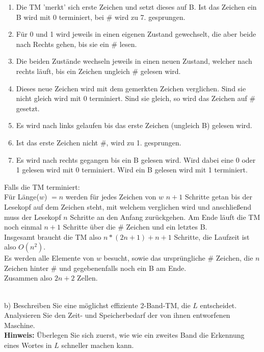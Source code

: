 \begin{enumerate}
\item Die TM 'merkt' sich erste Zeichen und setzt dieses auf B. Ist das Zeichen ein B wird mit 0 terminiert, bei $\#$ wird zu 7. gesprungen.
\item Für 0 und 1 wird jeweils in einen eigenen Zustand gewechselt, die aber beide nach Rechts gehen, bis sie ein $\#$ lesen.
\item Die beiden Zustände wechseln jeweils in einen neuen Zustand, welcher nach rechts läuft, bis ein Zeichen ungleich $\#$ gelesen wird.
\item Dieses neue Zeichen wird mit dem gemerkten Zeichen verglichen. Sind sie nicht gleich wird mit 0 terminiert. Sind sie gleich, so wird das Zeichen auf $\#$ gesetzt.
\item Es wird nach links gelaufen bis das erste Zeichen (ungleich B) gelesen wird.
\item Ist das erste Zeichen nicht $\#$, wird zu 1. gesprungen.
\item Es wird nach rechts gegangen bis ein B gelesen wird. Wird dabei eine 0 oder 1 gelesen wird mit 0 terminiert. Wird ein B gelesen wird mit 1 terminiert.
\end{enumerate}
Falls die TM terminiert:\\
Für Länge($w$) $= n$ werden für jedes Zeichen von $w$ $n+1$ Schritte getan bis der Lesekopf auf dem Zeichen steht, mit welchem verglichen wird und anschließend muss der Lesekopf $n$ Schritte an den Anfang zurückgehen. Am Ende läuft die TM noch einmal $n+1$ Schritte über die $\#$ Zeichen und ein letztes B.\\
Insgesamt braucht die TM also $n*(2n+1)+n+1$ Schritte, die Laufzeit ist also $O(n^2)$.\\
Es werden alle Elemente von $w$ besucht, sowie das ursprüngliche $\#$ Zeichen, die $n$ Zeichen hinter $\#$ und gegebenenfalls noch ein B am Ende.\\
Zusammen also $2n+2$ Zellen.\\\\

\newpage

b) Beschreiben Sie eine möglichst effiziente 2-Band-TM, die $L$ entscheidet. Analysieren Sie den Zeit- und Speicherbedarf der von ihnen entworfenen Maschine.\\
\textbf{Hinweis:} Überlegen Sie sich zuerst, wie wie ein zweites Band die Erkennung eines Wortes in $L$ schneller machen kann.

